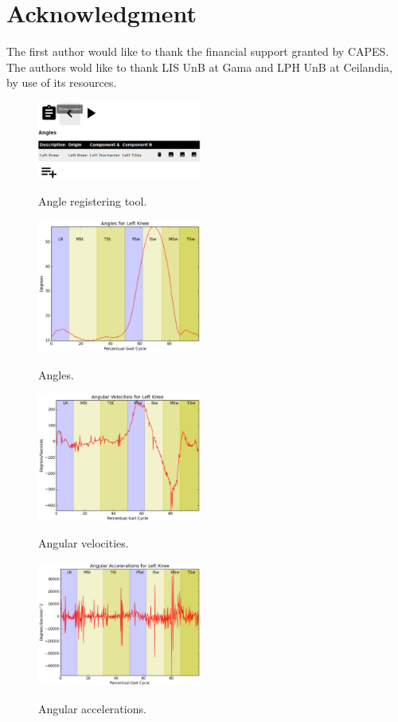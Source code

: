 \documentclass[journal]{IEEEtran}
\begin{document}
\section*{Acknowledgment}

The first author would like to thank the financial support granted by CAPES.
The authors wold like to thank LIS UnB at Gama and LPH UnB at Ceilandia,
by use of its resources.

\begin{figure}[!t]
	\centering
	{\includegraphics[width=0.48\textwidth]{img/angles_tool.eps}}
	\caption{Angle registering tool.}
	\label{angles_tool}
\end{figure}
\begin{figure}[!t]
	\centering
	{\includegraphics[width=0.48\textwidth]{img/angles.eps}}
	\caption{Angles.}
	\label{angles}
\end{figure}
\begin{figure}[!t]
	\centering
	{\includegraphics[width=0.48\textwidth]{img/av.eps}}
	\caption{Angular velocities.}
	\label{av}
\end{figure}
\begin{figure}[!t]
	\centering
	{\includegraphics[width=0.48\textwidth]{img/aa.eps}}
	\caption{Angular accelerations.}
	\label{aa}
\end{figure}
\end{document}
